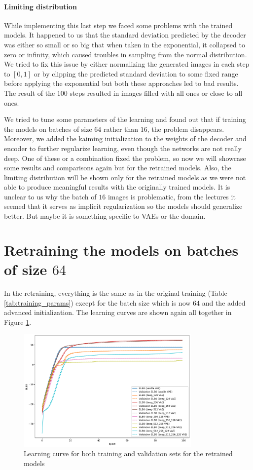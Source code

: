 \documentclass[a4paper,11pt]{article}
\begin{document}
\paragraph{Limiting distribution} While implementing this last step we faced some problems with the trained models.
It happened to us that the standard deviation predicted by the decoder was either so small or so big that when taken in the exponential, it collapsed to zero or infinity, which caused troubles in sampling from the normal distribution.
We tried to fix this issue by either normalizing the generated images in each step to $[0, 1]$ or by clipping the predicted standard deviation to some fixed range before applying the exponential but both these approaches led to bad results.
The result of the $100$ steps resulted in images filled with all ones or close to all ones.

We tried to tune some parameters of the learning and found out that if training the models on batches of size $64$ rather than $16$, the problem disappears.
Moreover, we added the kaiming initialization to the weights of the decoder and encoder to further regularize learning, even though the networks are not really deep.
One of these or a combination fixed the problem, so now we will showcase some results and comparisons again but for the retrained models.
Also, the limiting distribution will be shown only for the retrained models as we were not able to produce meaningful results with the originally trained models.
It is unclear to us why the batch of $16$ images is problematic, from the lectures it seemed that it serves as implicit regularization so the models should generalize better.
But maybe it is something specific to VAEs or the domain.

\section*{Retraining the models on batches of size $64$}
In the retraining, everything is the same as in the original training (Table \ref{tab:training_params}) except for the batch size which is now $64$ and the added advanced initialization.
The learning curves are shown again all together in Figure \ref{fig:64_learning_curve}.

\begin{figure}[ht]
    \centering
    \includegraphics[width=0.8\textwidth]{../images/64_learning_curve.png}
    \caption{Learning curve for both training and validation sets for the retrained models}
    \label{fig:64_learning_curve}
\end{figure}
\end{document}
